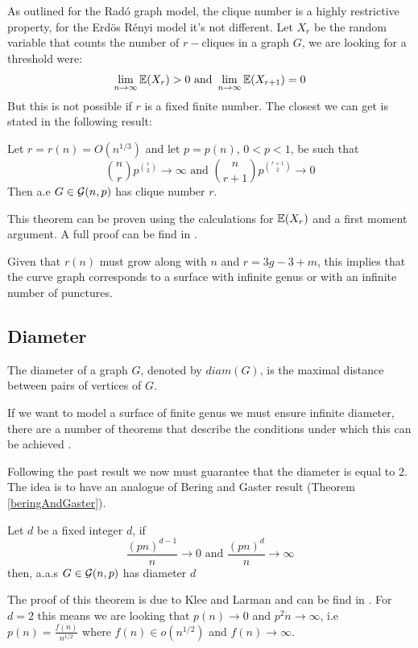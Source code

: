 As outlined for the Radó graph model, the clique number is a highly restrictive property, for the Erdös Rényi model it's not different. Let $X_r$ be the random variable that counts the number of $r-$cliques in a graph $G$, we are looking for a threshold were:
$$\lim\limits_{n \to \infty}\mathbb{E}(X_{r}) > 0 \text{ and } \lim\limits_{n \to \infty}\mathbb{E} (X_{r+1}) = 0$$
But this is not possible if $r$ is a fixed finite number. The closest we can get is stated in the following result:
\begin{theorem}\label{cliqueNumberER}
Let $r = r(n) = O(n^{1/3})$ and let $p=p(n)$, $0<p<1$, be such that
$$\binom{n}{r} p^{\binom{r}{2}} \to \infty \text{ and } \binom{n}{r+1} p^{\binom{r+1}{2}} \to 0 $$
Then a.e $G\in\mathcal{G}(n,p)$ has clique number $r$.
\end{theorem}

 This theorem can be proven using the calculations for $\mathbb{E}(X_{r})$ and a first moment argument. A full proof can be find in \cite[Bollobás, p.~290]{Bollobas}.

Given that $r(n)$ must grow along with $n$ and $r=3g-3+m$, this implies that the curve graph corresponds to a surface with infinite genus or with an infinite number of punctures.

\subsection{Diameter}

The diameter of a graph $G$, denoted by $diam(G)$, is the maximal distance between pairs of vertices of $G$.

If we want to model a surface of finite genus we must ensure infinite diameter, there are a number of theorems that describe the conditions under which this can be achieved \cite[Bollobás, p.~259]{Bollobas}.

Following the past result we now must guarantee that the diameter is equal to 2. The idea is to have an analogue of Bering and Gaster result (Theorem \ref{beringAndGaster}).

\begin{theorem}\label{diameterER}
Let $d$ be a fixed integer $d$, if 
$$\frac{(pn)^{d-1}}{n} \to 0 \text{ and } \frac{(pn)^{d}}{n} \to \infty $$
then, a.a.s $G\in\mathcal{G}(n,p)$ has diameter $d$
\end{theorem}

The proof of this theorem is due to Klee and Larman and can be find in \cite[Klee, Larman 81]{diameters}. For $d=2$ this means we are looking that $p(n)\to 0$ and $p^2 \dot n\to \infty$, i.e $p(n)= \frac{f(n)}{n^{1/2}}$ where $f(n)\in o(n^{1/2})$ and $f(n)\to \infty$.

